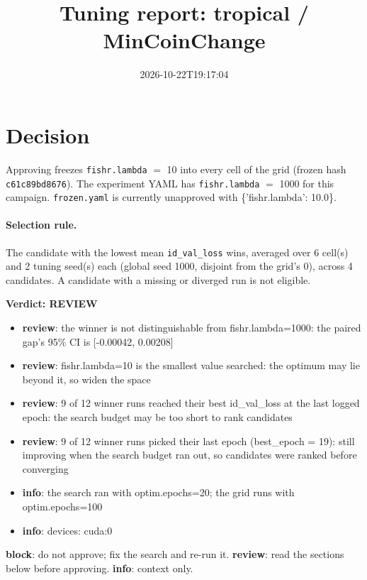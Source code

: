 \documentclass[10pt]{article}
\title{Tuning report: tropical / MinCoinChange}
\date{2026-10-22T19:17:04}
\begin{document}
\maketitle

\section{Decision}
Approving freezes
\texttt{fishr.lambda} $=$ 10 into every cell of the grid (frozen hash \texttt{c61c89bd8676}).
The experiment YAML has
\texttt{fishr.lambda} $=$ 1000 for this campaign.
\texttt{frozen.yaml} is currently unapproved with \{'fishr.lambda': 10.0\}.

\paragraph{Selection rule.} The candidate with the lowest mean \texttt{id\_val\_loss} wins, averaged over 6 cell(s) and 2 tuning seed(s) each (global seed 1000, disjoint from the grid's 0), across 4 candidates. A candidate with a missing or diverged run is not eligible.

\begin{framed}
\noindent\textbf{Verdict: \textcolor{orange!85!black}{REVIEW}}
\begin{itemize}\setlength\itemsep{0pt}
\item \textbf{review}: the winner is not distinguishable from fishr.lambda=1000: the paired gap's 95\% CI is [-0.00042, 0.00208]
\item \textbf{review}: fishr.lambda=10 is the smallest value searched: the optimum may lie beyond it, so widen the space
\item \textbf{review}: 9 of 12 winner runs reached their best id\_val\_loss at the last logged epoch: the search budget may be too short to rank candidates
\item \textbf{review}: 9 of 12 winner runs picked their last epoch (best\_epoch = 19): still improving when the search budget ran out, so candidates were ranked before converging
\item \textbf{info}: the search ran with optim.epochs=20; the grid runs with optim.epochs=100
\item \textbf{info}: devices: cuda:0
\end{itemize}
\end{framed}
\noindent\textbf{block}: do not approve; fix the search and re-run it. \textbf{review}: read the sections below before approving. \textbf{info}: context only.
\end{document}
